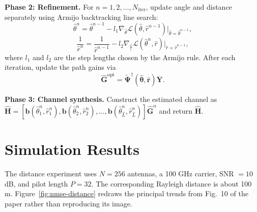 \documentclass[12pt,a4paper]{article}
\newcommand{\fieldvec}[1]{\boldsymbol{#1}}
\newcommand{\tightsection}[1]{\section{#1}\vspace{-0.35em}}
\begin{document}
\textbf{Phase 2: Refinement.}
For $n=1,2,\ldots,N_{\mathrm{iter}}$, update angle and distance
separately using Armijo backtracking line search:
\begin{equation}
  \hat{\theta}^{n}=\hat{\theta}^{n-1}
  -l_1\nabla_{\hat{\theta}}
  \mathcal{L}(\hat{\theta},\hat{r}^{n-1})
  \big|_{\hat{\theta}=\hat{\theta}^{n-1}},
  \label{eq:angle-update}
\end{equation}
\begin{equation}
  \frac{1}{\hat{r}^{n}}=\frac{1}{\hat{r}^{n-1}}
  -l_2\nabla_{\frac{1}{\hat{r}}}
  \mathcal{L}(\hat{\theta}^{n},\hat{r})
  \big|_{\hat{r}=\hat{r}^{n-1}},
  \label{eq:distance-update}
\end{equation}
where $l_1$ and $l_2$ are the step lengths chosen by the Armijo rule.
After each iteration, update the path gains via
\begin{equation}
  \hat{\fieldvec{G}}^{\mathrm{opt}}
  =\widetilde{\fieldvec{\Psi}}^{\dagger}
  (\hat{\fieldvec{\theta}},\hat{\fieldvec{r}})
  \overline{\fieldvec{Y}}.
  \label{eq:gain-update}
\end{equation}

\textbf{Phase 3: Channel synthesis.}
Construct the estimated channel as
$\hat{\fieldvec{H}}
=[\fieldvec{b}(\hat{\theta}_1^n,\hat{r}_1^n),
   \fieldvec{b}(\hat{\theta}_2^n,\hat{r}_2^n),\ldots,
   \fieldvec{b}(\hat{\theta}_{\hat{L}}^n,\hat{r}_{\hat{L}}^n)]
 \hat{\fieldvec{G}}^n$
and return $\hat{\fieldvec{H}}$.

\tightsection{Simulation Results}

The distance experiment uses $N=256$ antennas, a 100 GHz carrier,
SNR $=10$ dB, and pilot length $P=32$. The corresponding Rayleigh distance
is about 100 m. Figure~\ref{fig:nmse-distance} redraws the principal trends
from Fig.~10 of the paper rather than reproducing its image.
\end{document}
